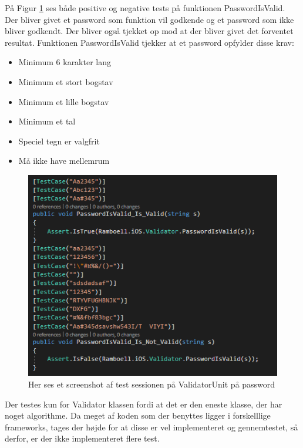 På Figur \ref{fig:ValidatorUnitPassword} ses både positive og negative tests på funktionen PasswordIsValid. Der bliver givet et password som funktion vil godkende og et password som ikke bliver godkendt. Der bliver også tjekket op mod at der bliver givet det forventet resultat. Funktionen PasswordIsValid tjekker at et password opfylder disse krav: 
\begin{itemize}
	\item Minimum 6 karakter lang
	\item Minimum et stort bogstav
	\item Minimum et lille bogstav
	\item Minimum et tal
	\item Speciel tegn er valgfrit
	\item Må ikke have mellemrum
\end{itemize}

\begin{figure}[H]
	\centering
	\includegraphics[width=0.6\linewidth]{Unit/ValidatorUnitPassword.PNG}
	\caption{Her ses et screenshot af test sessionen på ValidatorUnit på password}
	\label{fig:ValidatorUnitPassword}
\end{figure}

Der testes kun for Validator klassen fordi at det er den eneste klasse, der har noget algorithme. Da meget af koden som der benyttes ligger i forskelllige frameworks, tages der højde for at disse er vel implementeret og gennemtestet, så derfor, er der ikke implementeret flere test. 

